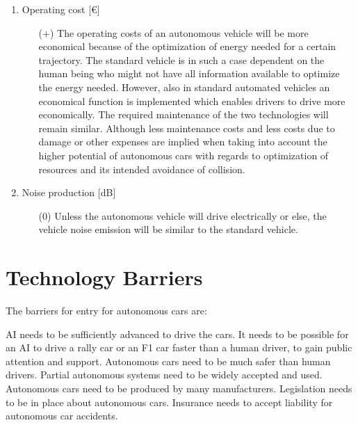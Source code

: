 \documentclass[a4paper]{article}
\begin{document}
\begin{enumerate}
\begin{enumerate}
    \end{enumerate}
\item Operating cost [€]
    \begin{enumerate}
    \item[($+$)] The operating costs of an autonomous vehicle will be more economical because of the optimization of energy needed for a certain trajectory. The standard vehicle is in such a case dependent on the human being who might not have all information available to optimize the energy needed. However, also in standard automated vehicles an economical function is implemented which enables drivers to drive more economically. The required maintenance of the two technologies will remain similar. Although less maintenance costs and less costs due to damage or other expenses are implied  when taking into account the higher potential of autonomous cars with regards to optimization of resources and its intended avoidance of collision.
    \end{enumerate}
\item Noise production [dB]
    \begin{enumerate}
    \item[($0$)] Unless the autonomous vehicle will drive electrically or else, the vehicle noise emission will be similar to the standard vehicle.
    \end{enumerate}
\end{enumerate}

\section{Technology Barriers}
\label{sec:technology-barriers}

The barriers for entry for autonomous cars are:

AI needs to be sufficiently advanced to drive the cars.
It needs to be possible for an AI to drive a rally car or an F1 car faster than a human driver, to gain public attention and support.
Autonomous cars need to be much safer than human drivers.
Partial autonomous systems need to be widely accepted and used.
Autonomous cars need to be produced by many manufacturers.
Legislation needs to be in place about autonomous cars.
Insurance needs to accept liability for autonomous car accidents.
\end{document}
